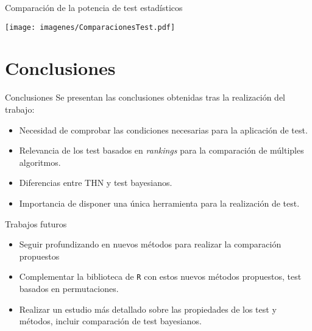 \documentclass[leqno]{beamer}
\theoremstyle{definition_wo_parentheses}
\begin{document}


\begin{frame}[fragile]{Comparación de la potencia de test estadísticos}
   \begin{center}
   \texttt{[image: imagenes/ComparacionesTest.pdf]}
   \end{center}
\end{frame}


\section{Conclusiones}

\begin{frame}{Conclusiones}
	Se presentan las conclusiones obtenidas tras la realización del trabajo:
\begin{itemize}
\item Necesidad de comprobar las condiciones necesarias para la aplicación de test.
\item Relevancia de los test basados en \textit{rankings} para la comparación de múltiples algoritmos.
\item Diferencias entre THN y test bayesianos.
\item Importancia de disponer una única herramienta para la realización de test.
\end{itemize}
\end{frame}

\begin{frame}{Trabajos futuros}
\begin{itemize}
\item Seguir profundizando en nuevos métodos para realizar la comparación propuestos
\item Complementar la biblioteca de \texttt{R} con estos nuevos métodos propuestos, test basados en permutaciones.
\item Realizar un estudio más detallado sobre las propiedades de los test y métodos, incluir comparación de test bayesianos.
\end{itemize}
\end{frame}
\end{document}

